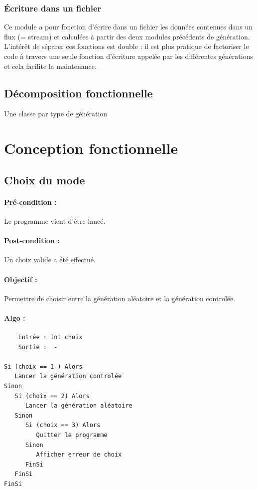 			\subsubsection{Écriture dans un fichier}
				Ce module a pour fonction d’écrire dans un fichier les données contenues dans un flux (= stream)  et calculées à partir des deux modules précédents de génération. L’intérêt de séparer ces fonctions est double : il est plus pratique de factoriser le code à travers une seule fonction d’écriture appelée par les différentes générations et cela facilite la maintenance.


		\subsection{Décomposition fonctionnelle}
			Une classe par type de génération 


	\section{Conception fonctionnelle}

		\subsection{Choix du mode}
			\paragraph{Pré-condition :} Le programme vient d’être lancé.
			\paragraph{Post-condition :} Un choix valide a été effectué.
			\paragraph{Objectif :} Permettre de choisir entre la génération aléatoire et la génération controlée.
			\paragraph{Algo :}
			\begin{verbatim} 
	Entrée : Int choix
	Sortie :  -

Si (choix == 1 ) Alors
   Lancer la génération controlée
Sinon
   Si (choix == 2) Alors
	  Lancer la génération aléatoire 
   Sinon
	  Si (choix == 3) Alors
	     Quitter le programme
	  Sinon
	     Afficher erreur de choix 
	  FinSi
   FinSi
FinSi
		\end{verbatim} 

